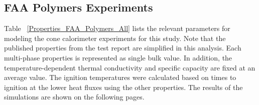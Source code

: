 \clearpage

\subsection{FAA Polymers Experiments}\label{sec_FAA_Polymers_Materials}

Table ~\ref{Properties_FAA_Polymers_All} lists the relevant parameters for modeling the cone calorimeter experiments for this study.
Note that the published properties from the test report are simplified in this analysis. Each multi-phase properties is represented as single bulk value. In addition, the temperature-dependent thermal conductivity and specific capacity are fixed at an average value.
The ignition temperatures were calculated based on times to ignition at the lower heat fluxes using the other properties.
The results of the simulations are shown on the following pages.

